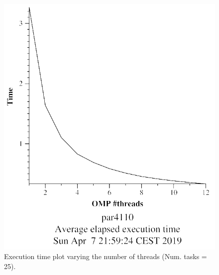 \documentclass[12pt, a4paper]{article}
\begin{document}
\begin{figure}[H]
\centering
\begin{minipage}[b]{0.4\linewidth}
  \centering
  \includegraphics[scale=0.5]{./mandel-omp-10000-strong-omp-24-25-time}
  \caption{Execution time plot varying the number of threads (Num. tasks = 25).}
  \label{fig:mandel-omp-10000-strong-omp-24-25-time}
\end{minipage}%
\hspace{0.5cm}
\begin{minipage}[b]{0.4\linewidth}
  \centering

\end{minipage}
\end{figure}
\end{document}
